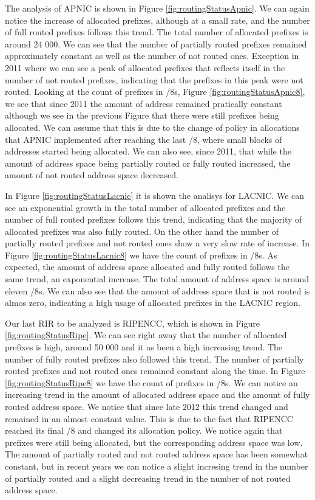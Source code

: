 \documentclass[11pt,a4paper]{scrreprt}
\begin{document}
The analysis of APNIC is shown in Figure \ref{fig:routingStatusApnic}. We can again notice the increase of allocated prefixes, although at a small rate, and the number of full routed prefixes follows this trend. The total number of allocated prefixes is around 24 000. We can see that the number of partially routed prefixes remained approximately constant as well as the number of not routed ones. Exception in 2011 where we can see a peak of allocated prefixes that reflects itself in the number of not routed prefixes, indicating that the prefixes in this peak were not routed. Looking at the count of prefixes in /8s, Figure \ref{fig:routingStatusApnic8}, we see that since 2011 the amount of address remained pratically constant although we see in the previous Figure that there were still prefixes being allocated. We can assume that this is due to the change of policy in allocations that APNIC implemented after reaching the last /8, where small blocks of addresses started being allocated. We can also see, since 2011, that while the amount of address space being partially routed or fully routed increased, the amount of not routed address space decreased.

In Figure \ref{fig:routingStatusLacnic} it is shown the analisys for LACNIC. We can see an exponential growth in the total number of allocated prefixes and the number of full routed prefixes follows this trend, indicating that the majority of allocated prefixes was also fully routed. On the other hand the number of partially routed prefixes and not routed ones show a very slow rate of increase. In Figure \ref{fig:routingStatusLacnic8} we have the count of prefixes in /8s. As expected, the amount of address space allocated and fully routed follows the same trend, an exponential increase. The total amount of address space is around eleven /8s. We can also see that the amount of address space that is not routed is almos zero, indicating a high usage of allocated prefixes in the LACNIC region.

Our last RIR to be analyzed is RIPENCC, which is shown in Figure \ref{fig:routingStatusRipe}. We can see right away that the number of allocated prefixes is high, around 50 000 and it as been a high increasing trend. The number of fully routed prefixes also followed this trend. The number of partially routed prefixes and not routed ones remained constant along the time. In Figure \ref{fig:routingStatusRipe8} we have the count of prefixes in /8s. We can notice an increasing trend in the amount of allocated address space and the amount of fully routed address space. We notice that since late 2012 this trend changed and remained in an almost constant value. This is due to the fact that RIPENCC reached its final /8 and changed its allocation policy. We notice again that prefixes were still being allocated, but the corresponding address space was low. The amount of partially routed and not routed address space has been somewhat constant, but in recent years we can notice a slight incresing trend in the number of partially routed and a slight decreasing trend in the number of not routed address space.
\end{document}
